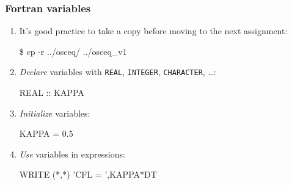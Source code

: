 \documentclass[aspectratio=43,9pt]{beamer}
\begin{document}
\begin{frame}
	\frametitle{Fortran variables}
	\begin{enumerate}
		\item It's good practice to take a copy before moving to the next assignment:
			\par\vspace*{1ex}\hspace*{.05\textwidth}\parbox{.5\textwidth}{\ttfamily
				\$   cp -r ../osceq/ ../osceq\_v1
			}\vspace*{1ex}\par			
		\item \emph{Declare} variables with \texttt{REAL}, \texttt{INTEGER}, \texttt{CHARACTER}, \ldots:
			\par\vspace*{1ex}\hspace*{.05\textwidth}\parbox{.8\textwidth}{\ttfamily\small
				\textcolor{green!80!black}{REAL}    :: KAPPA
			}\vspace*{1ex}\par
		\item \emph{Initialize} variables:
			\par\vspace*{1ex}\hspace*{.05\textwidth}\parbox{.8\textwidth}{\ttfamily\small
				KAPPA \textcolor{green!80!black}{=} 0.5
			}\vspace*{1ex}\par
		\item \emph{Use} variables in expressions:
			\par\vspace*{1ex}\hspace*{.05\textwidth}\parbox{.8\textwidth}{\ttfamily\small
				WRITE (*,*) 'CFL = ',\textcolor{green!80!black}{KAPPA}*DT
			}\vspace*{1ex}\par			
	\end{enumerate}
\end{frame}
%
%
\end{document}
